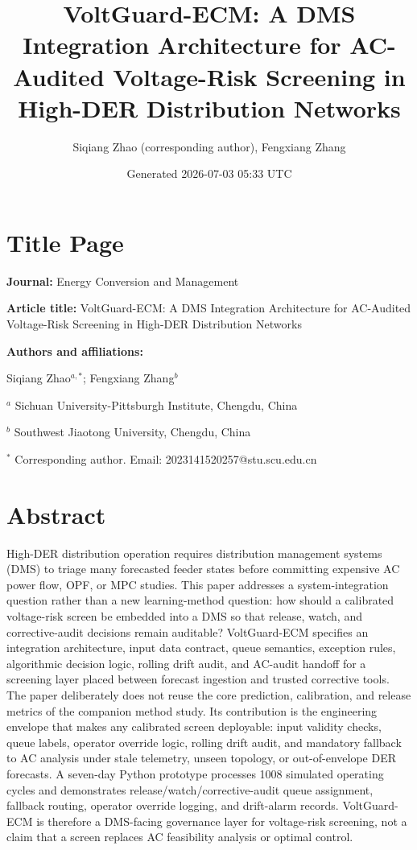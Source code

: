 \documentclass[
  preprint,12pt]{elsarticle}
\title{VoltGuard-ECM: A DMS Integration Architecture for AC-Audited
Voltage-Risk Screening in High-DER Distribution Networks}
\author{Siqiang Zhao (corresponding author), Fengxiang Zhang}
\date{Generated 2026-07-03 05:33 UTC}
\begin{document}
\maketitle

\section*{Title Page}\label{title-page}

\textbf{Journal:} Energy Conversion and Management

\textbf{Article title:} VoltGuard-ECM: A DMS Integration Architecture
for AC-Audited Voltage-Risk Screening in High-DER Distribution Networks

\textbf{Authors and affiliations:}

Siqiang Zhao\(^{a,*}\); Fengxiang Zhang\(^{b}\)

\(^{a}\) Sichuan University-Pittsburgh Institute, Chengdu, China

\(^{b}\) Southwest Jiaotong University, Chengdu, China

\(^{*}\) Corresponding author. Email: 2023141520257@stu.scu.edu.cn

\section*{Abstract}\label{abstract}

High-DER distribution operation requires distribution management systems
(DMS) to triage many forecasted feeder states before committing
expensive AC power flow, OPF, or MPC studies. This paper addresses a
system-integration question rather than a new learning-method question:
how should a calibrated voltage-risk screen be embedded into a DMS so
that release, watch, and corrective-audit decisions remain auditable?
VoltGuard-ECM specifies an integration architecture, input data
contract, queue semantics, exception rules, algorithmic decision logic,
rolling drift audit, and AC-audit handoff for a screening layer placed
between forecast ingestion and trusted corrective tools. The paper
deliberately does not reuse the core prediction, calibration, and
release metrics of the companion method study. Its contribution is the
engineering envelope that makes any calibrated screen deployable: input
validity checks, queue labels, operator override logic, rolling drift
audit, and mandatory fallback to AC analysis under stale telemetry,
unseen topology, or out-of-envelope DER forecasts. A seven-day Python
prototype processes 1008 simulated operating cycles and demonstrates
release/watch/corrective-audit queue assignment, fallback routing,
operator override logging, and drift-alarm records. VoltGuard-ECM is
therefore a DMS-facing governance layer for voltage-risk screening, not
a claim that a screen replaces AC feasibility analysis or optimal
control.
\end{document}
